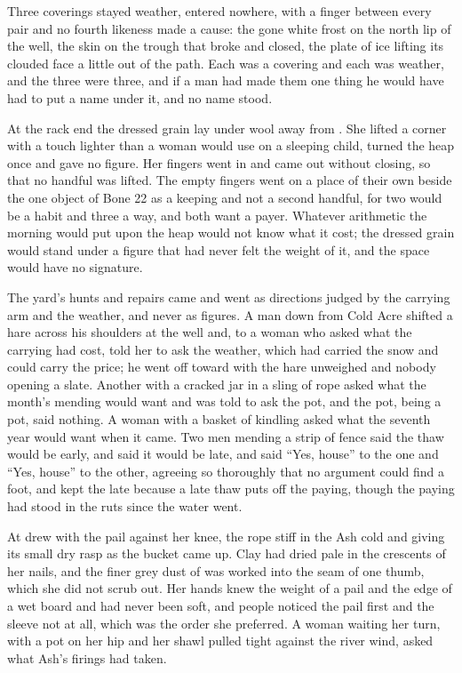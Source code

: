 Three coverings stayed weather, entered nowhere, with a finger between every pair and no fourth likeness made a cause: the gone white frost on the north lip of the well, the skin on the trough that broke and closed, the plate of ice lifting its clouded face a little out of the path. Each was a covering and each was weather, and the three were three, and if a man had made them one thing he would have had to put a name under it, and no name stood.

At the rack end the dressed grain lay under wool away from . She lifted a corner with a touch lighter than a woman would use on a sleeping child, turned the heap once and gave no figure. Her fingers went in and came out without closing, so that no handful was lifted. The empty fingers went on a place of their own beside the one object of Bone 22 as a keeping and not a second handful, for two would be a habit and three a way, and both want a payer. Whatever arithmetic the morning would put upon the heap would not know what it cost; the dressed grain would stand under a figure that had never felt the weight of it, and the space would have no signature.

The yard’s hunts and repairs came and went as directions judged by the carrying arm and the weather, and never as figures. A man down from Cold Acre shifted a hare across his shoulders at the well and, to a woman who asked what the carrying had cost, told her to ask the weather, which had carried the snow and could carry the price; he went off toward  with the hare unweighed and nobody opening a slate. Another with a cracked jar in a sling of rope asked what the month’s mending would want and was told to ask the pot, and the pot, being a pot, said nothing. A woman with a basket of kindling asked what the seventh year would want when it came. Two men mending a strip of fence said the thaw would be early, and said it would be late, and  said “Yes, house” to the one and “Yes, house” to the other, agreeing so thoroughly that no argument could find a foot, and kept the late because a late thaw puts off the paying, though the paying had stood in the ruts since the water went.

At   drew with the pail against her knee, the rope stiff in the Ash cold and giving its small dry rasp as the bucket came up. Clay had dried pale in the crescents of her nails, and the finer grey dust of  was worked into the seam of one thumb, which she did not scrub out. Her hands knew the weight of a pail and the edge of a wet board and had never been soft, and people noticed the pail first and the sleeve not at all, which was the order she preferred. A woman waiting her turn, with a pot on her hip and her shawl pulled tight against the river wind, asked what Ash’s firings had taken.

